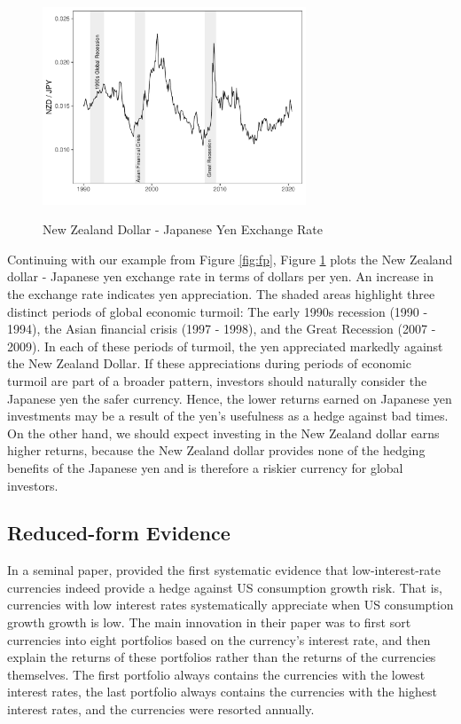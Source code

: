 \documentclass[12pt,letter]{article}
\theoremstyle{break} \theorembodyfont{\normalfont\itshape}
\theoremstyle{break}
\theoremstyle{break} \theorembodyfont{\normalfont\itshape}
\theoremstyle{break} \theorembodyfont{\normalfont\itshape}
\begin{document}
\begin{figure}[htp!]
  \centering
  \caption{New Zealand Dollar - Japanese Yen Exchange Rate}
  \includegraphics[width=0.7\textwidth]{Exhibits/Figure_FX_JPYNZD.pdf}
  \label{fig:spot}
\end{figure}
Continuing with our example from Figure \ref{fig:fp}, Figure
\ref{fig:spot} plots the New Zealand dollar - Japanese yen exchange
rate in terms of dollars per yen. An increase in the exchange rate
indicates yen appreciation. The shaded areas highlight three distinct
periods of global economic turmoil: The early 1990s recession (1990 -
1994), the Asian financial crisis (1997 - 1998), and the Great
Recession (2007 - 2009). In each of these periods of turmoil, the yen
appreciated markedly against the New Zealand Dollar. If these
appreciations during periods of economic turmoil are part of a broader
pattern, investors should naturally consider the Japanese yen the
safer currency. Hence, the lower returns earned on Japanese yen
investments may be a result of the yen's usefulness as a hedge against
bad times. On the other hand, we should expect investing in the New
Zealand dollar earns higher returns, because the New Zealand dollar
provides none of the hedging benefits of the Japanese yen and is
therefore a riskier currency for global investors.

\subsection{Reduced-form Evidence}

In a seminal paper, \citet{LustigVerdelhan2007} provided the first
systematic evidence that low-interest-rate currencies indeed provide a
hedge against US consumption growth risk. That is, currencies with low
interest rates systematically appreciate when US consumption growth
growth is low. The main innovation in their paper was to first sort
currencies into eight portfolios based on the currency's interest
rate, and then explain the returns of these portfolios rather than the
returns of the currencies themselves. The first portfolio always
contains the currencies with the lowest interest rates, the last
portfolio always contains the currencies with the highest interest
rates, and the currencies were resorted annually.
\end{document}
